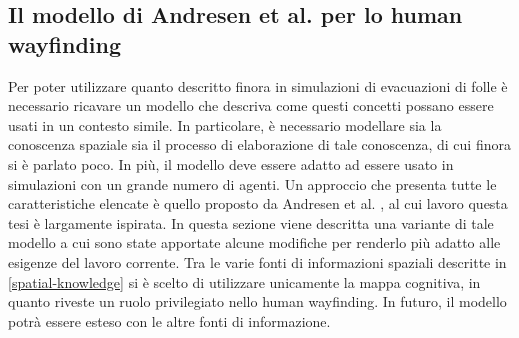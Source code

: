 \documentclass[12pt,a4paper,openright,oneside]{book}
\begin{document}
\subsection{Il modello di Andresen et al. per lo human wayfinding}
Per poter utilizzare quanto descritto finora in  simulazioni di evacuazioni di folle è necessario ricavare un modello che descriva come questi concetti possano essere usati in un contesto simile. In particolare, è necessario modellare sia la conoscenza spaziale sia il processo di elaborazione di tale conoscenza, di cui finora si è parlato poco. In più, il modello deve essere adatto ad essere usato in simulazioni con un grande numero di agenti. Un approccio che presenta tutte le caratteristiche elencate è quello proposto da Andresen et al. \cite{Andresen2018}, al cui lavoro questa tesi è largamente ispirata. In questa sezione viene descritta una variante di tale modello a cui sono state apportate alcune modifiche per renderlo più adatto alle esigenze del lavoro corrente. Tra le varie fonti di informazioni spaziali descritte in \ref{spatial-knowledge} si è scelto di utilizzare unicamente la mappa cognitiva, in quanto riveste un ruolo privilegiato nello human wayfinding. In futuro, il modello potrà essere esteso con le altre fonti di informazione.
\end{document}
